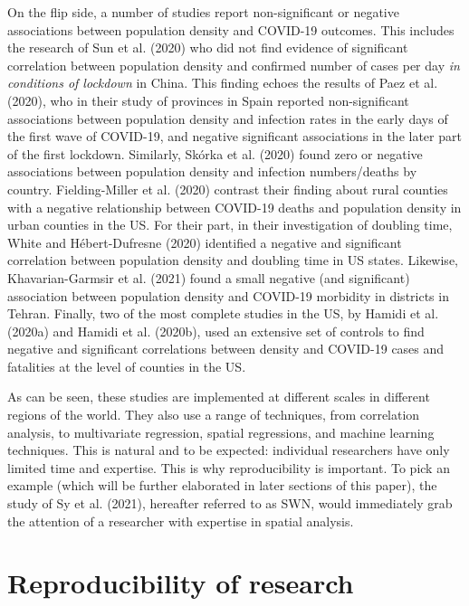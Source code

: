 \documentclass[]{elsarticle} %
\begin{document}
On the flip side, a number of studies report non-significant or negative
associations between population density and COVID-19 outcomes. This
includes the research of Sun et al. (2020) who did not find evidence of
significant correlation between population density and confirmed number
of cases per day \emph{in conditions of lockdown} in China. This finding
echoes the results of Paez et al. (2020), who in their study of
provinces in Spain reported non-significant associations between
population density and infection rates in the early days of the first
wave of COVID-19, and negative significant associations in the later
part of the first lockdown. Similarly, Skórka et al. (2020) found zero
or negative associations between population density and infection
numbers/deaths by country. Fielding-Miller et al. (2020) contrast their
finding about rural counties with a negative relationship between
COVID-19 deaths and population density in urban counties in the US. For
their part, in their investigation of doubling time, White and
Hébert-Dufresne (2020) identified a negative and significant correlation
between population density and doubling time in US states. Likewise,
Khavarian-Garmsir et al. (2021) found a small negative (and significant)
association between population density and COVID-19 morbidity in
districts in Tehran. Finally, two of the most complete studies in the
US, by Hamidi et al. (2020a) and Hamidi et al. (2020b), used an
extensive set of controls to find negative and significant correlations
between density and COVID-19 cases and fatalities at the level of
counties in the US.

As can be seen, these studies are implemented at different scales in
different regions of the world. They also use a range of techniques,
from correlation analysis, to multivariate regression, spatial
regressions, and machine learning techniques. This is natural and to be
expected: individual researchers have only limited time and expertise.
This is why reproducibility is important. To pick an example (which will
be further elaborated in later sections of this paper), the study of Sy
et al. (2021), hereafter referred to as SWN, would immediately grab the
attention of a researcher with expertise in spatial analysis.

\hypertarget{reproducibility-of-research}{%
\section{Reproducibility of
research}\label{reproducibility-of-research}}
\end{document}
